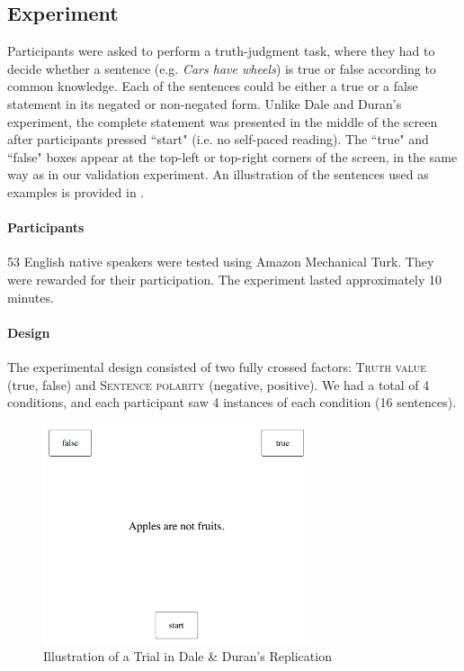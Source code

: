 \documentclass{article}
\begin{document}


\subsection{Experiment}
Participants were asked to perform a truth-judgment task, where they had to decide whether a sentence (e.g. \textit{Cars have wheels}) is true or false according to common knowledge. Each of the sentences could be either a true or a false statement in its negated or non-negated form. 
Unlike Dale and Duran's experiment, the complete statement was presented in the middle of the screen after participants pressed ``start" (i.e. no self-paced reading). The ``true" and ``false"  boxes appear at the top-left or top-right corners of the screen, in the same way as in our validation experiment.  
An illustration of the sentences used as examples is provided in . 

\paragraph{Participants}
53 English native speakers were tested using Amazon Mechanical Turk. They were rewarded for their participation. The experiment lasted approximately 10 minutes. 

\paragraph{Design}
The experimental design consisted of two fully crossed factors: \textsc{Truth value} (true, false) and \textsc{Sentence polarity} (negative, positive). We had a total of 4 conditions, and each participant saw 4 instances of each condition (16 sentences). 


\begin{figure}
\centering
\includegraphics[width=0.7\textwidth]{trial_example2.png}
\caption{Illustration of a Trial in Dale \& Duran's Replication}
\end{figure}
\end{document}
